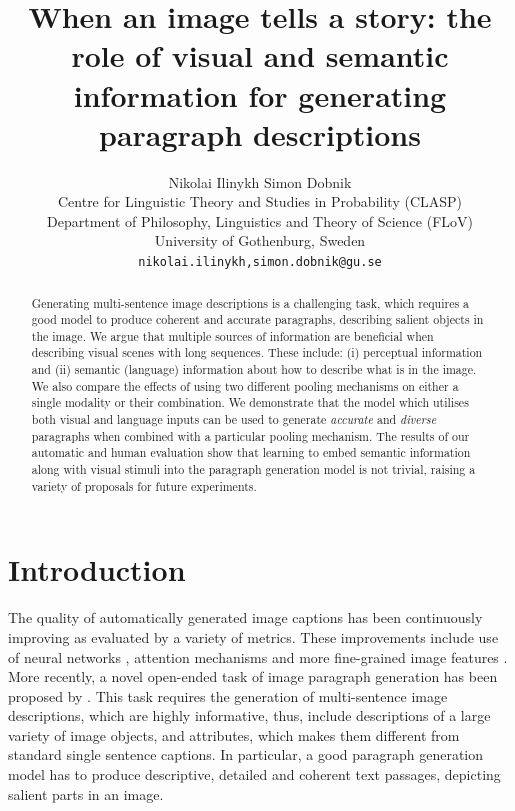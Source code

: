 \documentclass[11pt,a4paper]{article}
\title{When an image tells a story: the role of visual and semantic information for generating paragraph descriptions}
\author{Nikolai Ilinykh \space\space\space\space\space\space\space Simon Dobnik\\
 Centre for Linguistic Theory and Studies in Probability (CLASP) \\
 Department of Philosophy, Linguistics and Theory of Science (FLoV) \\
 University of Gothenburg, Sweden \\
 \texttt{nikolai.ilinykh,simon.dobnik@gu.se} }
\date{}
\begin{document}
\maketitle
\begin{abstract}

  Generating multi-sentence image descriptions is a challenging task, which requires a good model to produce coherent and accurate paragraphs, describing salient objects in the image. %
We argue that multiple sources of information are beneficial when describing visual scenes with long sequences. These include: (i) perceptual information and (ii) semantic (language) information about how to describe what is in the image. We also compare the effects of using two different pooling mechanisms on either a single modality or their combination. %
We demonstrate that the model which utilises both visual and language inputs can be used to generate \textit{accurate} and \textit{diverse} paragraphs when combined with a particular pooling mechanism. The results of our automatic and human evaluation show that learning to embed semantic information along with visual stimuli into the paragraph generation model %
is not trivial, raising a variety of proposals for future experiments.

\end{abstract}

\section{Introduction}\label{sec:introduction}

The quality of automatically generated image captions \cite{bernardi2016automatic} has been continuously improving as evaluated by a variety of metrics.
These improvements include use of neural networks \cite{kiros14,vinyals2014tell}, attention mechanisms \cite{xu2015attend,Lu2016} and more fine-grained image features \cite{anderson2017bottomup}.
More recently, a novel open-ended task of image paragraph generation has been proposed by .
This task requires the generation of multi-sentence image descriptions, which are highly informative, thus, include descriptions of a large variety of image objects, and attributes, which makes them different from standard single sentence captions.
In particular, a good paragraph generation model has to produce descriptive, detailed and coherent text passages, depicting salient parts in an image.
\end{document}
